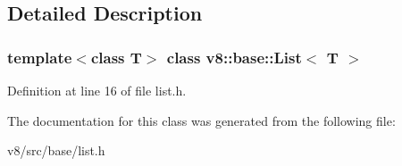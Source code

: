 \subsection{Detailed Description}
\subsubsection*{template$<$class T$>$\newline
class v8\+::base\+::\+List$<$ T $>$}



Definition at line 16 of file list.\+h.



The documentation for this class was generated from the following file\+:\begin{DoxyCompactItemize}
\item 
v8/src/base/list.\+h\end{DoxyCompactItemize}
